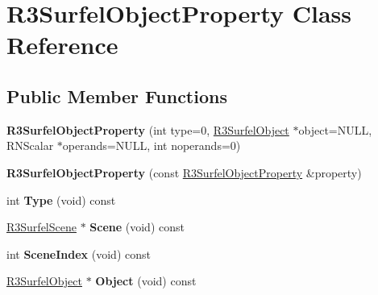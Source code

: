 \hypertarget{class_r3_surfel_object_property}{}\section{R3\+Surfel\+Object\+Property Class Reference}
\label{class_r3_surfel_object_property}
\subsection*{Public Member Functions}
\begin{DoxyCompactItemize}
\item 
{\bfseries R3\+Surfel\+Object\+Property} (int type=0, \hyperlink{class_r3_surfel_object}{R3\+Surfel\+Object} $\ast$object=N\+U\+LL, R\+N\+Scalar $\ast$operands=N\+U\+LL, int noperands=0)\hypertarget{class_r3_surfel_object_property_ac87fbbbc62b53631386ea534244464bc}{}\label{class_r3_surfel_object_property_ac87fbbbc62b53631386ea534244464bc}

\item 
{\bfseries R3\+Surfel\+Object\+Property} (const \hyperlink{class_r3_surfel_object_property}{R3\+Surfel\+Object\+Property} \&property)\hypertarget{class_r3_surfel_object_property_a7095cfa3eba29d3bb1cfb7ebf2096ae0}{}\label{class_r3_surfel_object_property_a7095cfa3eba29d3bb1cfb7ebf2096ae0}

\item 
int {\bfseries Type} (void) const \hypertarget{class_r3_surfel_object_property_ad7a02acafb60c04abbd4c2981da6c0c3}{}\label{class_r3_surfel_object_property_ad7a02acafb60c04abbd4c2981da6c0c3}

\item 
\hyperlink{class_r3_surfel_scene}{R3\+Surfel\+Scene} $\ast$ {\bfseries Scene} (void) const \hypertarget{class_r3_surfel_object_property_a53e624c86b6aa2ab1120b710c8353d27}{}\label{class_r3_surfel_object_property_a53e624c86b6aa2ab1120b710c8353d27}

\item 
int {\bfseries Scene\+Index} (void) const \hypertarget{class_r3_surfel_object_property_a6040a619e28684566fbe35bcd63152f8}{}\label{class_r3_surfel_object_property_a6040a619e28684566fbe35bcd63152f8}

\item 
\hyperlink{class_r3_surfel_object}{R3\+Surfel\+Object} $\ast$ {\bfseries Object} (void) const \hypertarget{class_r3_surfel_object_property_ad4f61bfc2e9c1d5426135ccee60f2ad9}{}\label{class_r3_surfel_object_property_ad4f61bfc2e9c1d5426135ccee60f2ad9}


\end{DoxyCompactItemize}

